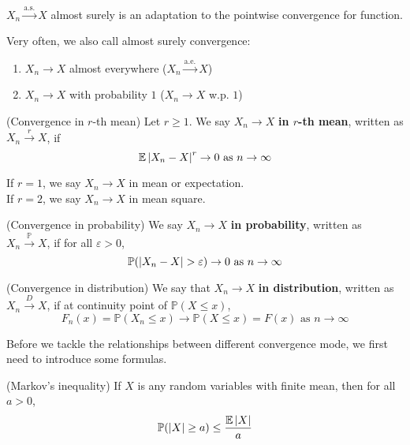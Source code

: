 \documentclass{huhtakm-template-book}
\newcommand{\prob}{\mathbb{P}}
\newcommand{\expect}{\mathbb{E}}
\begin{document}
\begin{rem}
    $X_{n}\xrightarrow{\text{a.s.}}X$ almost surely is an adaptation to the pointwise convergence for function.
\end{rem}
\begin{rem}
    Very often, we also call almost surely convergence:
    \begin{enumerate}
        \item $X_{n}\to X$ almost everywhere ($X_{n}\xrightarrow{\text{a.e.}}X$)
        \item $X_{n}\to X$ with probability $1$ ($X_{n}\to X$ w.p. $1$)
    \end{enumerate}
\end{rem}
\begin{defn}(Convergence in $r$-th mean)
    Let $r\geq 1$. We say $X_{n}\to X$ \textbf{in $r$-th mean}, written as $X_{n}\xrightarrow{r}X$, if
    \begin{equation*}
        \expect\abs{X_{n}-X}^{r}\to 0\text{ as }n\to\infty
    \end{equation*}
\end{defn}
\begin{eg}
    If $r=1$, we say $X_{n}\to X$ in mean or expectation.\\
    If $r=2$, we say $X_{n}\to X$ in mean square.
\end{eg}
\begin{defn}(Convergence in probability)
    We say $X_{n}\to X$ \textbf{in probability}, written as $X_{n}\xrightarrow{\prob}X$, if for all $\varepsilon>0$,
    \begin{equation*}
        \prob(\abs{X_{n}-X}>\varepsilon)\to 0\text{ as }n\to\infty
    \end{equation*}
\end{defn}
\begin{defn}(Convergence in distribution)
    We say that $X_{n}\to X$ \textbf{in distribution}, written as $X_{n}\xrightarrow{D}X$, if at continuity point of $\prob(X\leq x)$,
    \begin{equation*}
        F_{n}(x)=\prob(X_{n}\leq x)\to\prob(X\leq x)=F(x)\text{ as }n\to\infty
    \end{equation*}
\end{defn}
Before we tackle the relationships between different convergence mode, we first need to introduce some formulas.
\begin{lem}(Markov's inequality)
    If $X$ is any random variables with finite mean, then for all $a>0$,
    \begin{equation*}
        \prob(\abs{X}\geq a)\leq\frac{\expect\abs{X}}{a}
    \end{equation*}
\end{lem}
\end{document}
